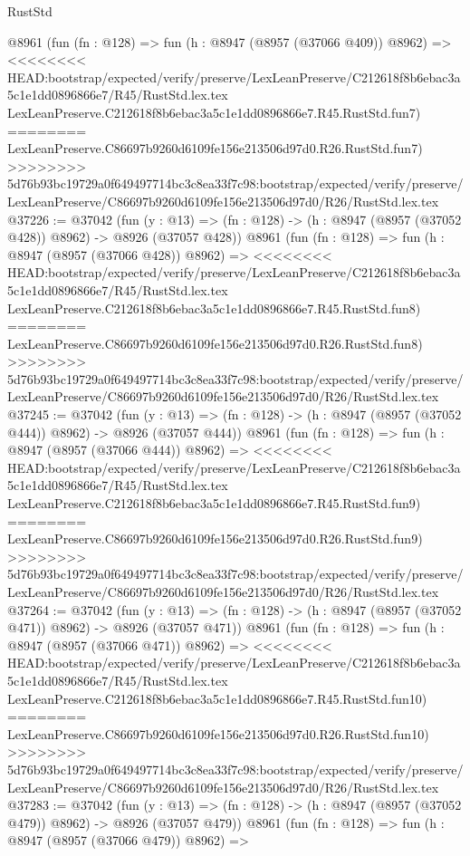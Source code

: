\begin{lexlean}{RustStd}
\begin{coremodule}
{\begin{coremodule}
{{{{{{{{{{{{{{{{{{{{{{{{{{{{{{{{{{{{{{{    @8961
    (fun (fn : @128) =>
    fun (h : @8947 (@8957 (@37066 @409)) @8962) =>
<<<<<<<< HEAD:bootstrap/expected/verify/preserve/LexLeanPreserve/C212618f8b6ebac3a5c1e1dd0896866e7/R45/RustStd.lex.tex
    LexLeanPreserve.C212618f8b6ebac3a5c1e1dd0896866e7.R45.RustStd.fun7)
========
    LexLeanPreserve.C86697b9260d6109fe156e213506d97d0.R26.RustStd.fun7)
>>>>>>>> 5d76b93bc19729a0f649497714bc3c8ea33f7c98:bootstrap/expected/verify/preserve/LexLeanPreserve/C86697b9260d6109fe156e213506d97d0/R26/RustStd.lex.tex
@37226 := @37042
    (fun (y : @13) => (fn : @128) -> (h : @8947 (@8957 (@37052 @428)) @8962) -> @8926 (@37057 @428))
    @8961
    (fun (fn : @128) =>
    fun (h : @8947 (@8957 (@37066 @428)) @8962) =>
<<<<<<<< HEAD:bootstrap/expected/verify/preserve/LexLeanPreserve/C212618f8b6ebac3a5c1e1dd0896866e7/R45/RustStd.lex.tex
    LexLeanPreserve.C212618f8b6ebac3a5c1e1dd0896866e7.R45.RustStd.fun8)
========
    LexLeanPreserve.C86697b9260d6109fe156e213506d97d0.R26.RustStd.fun8)
>>>>>>>> 5d76b93bc19729a0f649497714bc3c8ea33f7c98:bootstrap/expected/verify/preserve/LexLeanPreserve/C86697b9260d6109fe156e213506d97d0/R26/RustStd.lex.tex
@37245 := @37042
    (fun (y : @13) => (fn : @128) -> (h : @8947 (@8957 (@37052 @444)) @8962) -> @8926 (@37057 @444))
    @8961
    (fun (fn : @128) =>
    fun (h : @8947 (@8957 (@37066 @444)) @8962) =>
<<<<<<<< HEAD:bootstrap/expected/verify/preserve/LexLeanPreserve/C212618f8b6ebac3a5c1e1dd0896866e7/R45/RustStd.lex.tex
    LexLeanPreserve.C212618f8b6ebac3a5c1e1dd0896866e7.R45.RustStd.fun9)
========
    LexLeanPreserve.C86697b9260d6109fe156e213506d97d0.R26.RustStd.fun9)
>>>>>>>> 5d76b93bc19729a0f649497714bc3c8ea33f7c98:bootstrap/expected/verify/preserve/LexLeanPreserve/C86697b9260d6109fe156e213506d97d0/R26/RustStd.lex.tex
@37264 := @37042
    (fun (y : @13) => (fn : @128) -> (h : @8947 (@8957 (@37052 @471)) @8962) -> @8926 (@37057 @471))
    @8961
    (fun (fn : @128) =>
    fun (h : @8947 (@8957 (@37066 @471)) @8962) =>
<<<<<<<< HEAD:bootstrap/expected/verify/preserve/LexLeanPreserve/C212618f8b6ebac3a5c1e1dd0896866e7/R45/RustStd.lex.tex
    LexLeanPreserve.C212618f8b6ebac3a5c1e1dd0896866e7.R45.RustStd.fun10)
========
    LexLeanPreserve.C86697b9260d6109fe156e213506d97d0.R26.RustStd.fun10)
>>>>>>>> 5d76b93bc19729a0f649497714bc3c8ea33f7c98:bootstrap/expected/verify/preserve/LexLeanPreserve/C86697b9260d6109fe156e213506d97d0/R26/RustStd.lex.tex
@37283 := @37042
    (fun (y : @13) => (fn : @128) -> (h : @8947 (@8957 (@37052 @479)) @8962) -> @8926 (@37057 @479))
    @8961
    (fun (fn : @128) =>
    fun (h : @8947 (@8957 (@37066 @479)) @8962) =>
}}}}}}}}}}}}}}}}}}}}}}}}}}}}}}}}}}}}}}}
\end{coremodule}}
\end{coremodule}
\end{lexlean}
